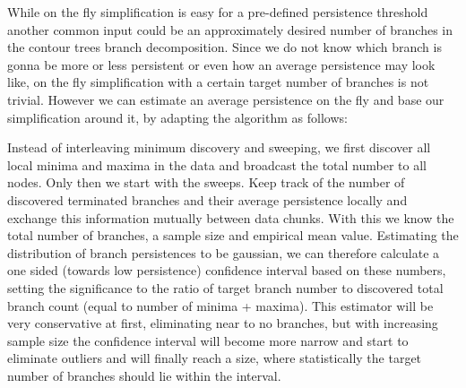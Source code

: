 \documentclass{scrartcl}
\begin{document}
While on the fly simplification is easy for a pre-defined persistence threshold another common input could be an approximately desired number of branches in the contour trees branch decomposition. Since we do not know which branch is gonna be more or less persistent or even how an average persistence may look like, on the fly simplification with a certain target number of branches is not trivial. However we can estimate an average persistence on the fly and base our simplification around it, by adapting the algorithm as follows:

Instead of interleaving minimum discovery and sweeping, we first discover all local minima and maxima in the data and broadcast the total number to all nodes. Only then we start with the sweeps. Keep track of the number of discovered terminated branches and their average persistence locally and exchange this information mutually between data chunks. With this we know the total number of branches, a sample size and empirical mean value. Estimating the distribution of branch persistences to be gaussian, we can therefore calculate a one sided (towards low persistence) confidence interval based on these numbers, setting the significance to the ratio of target branch number to discovered total branch count (equal to number of minima + maxima). This estimator will be very conservative at first, eliminating near to no branches, but with increasing sample size the confidence interval will become more narrow and start to eliminate outliers and will finally reach a size, where statistically the target number of branches should lie within the interval. 




\end{document}
